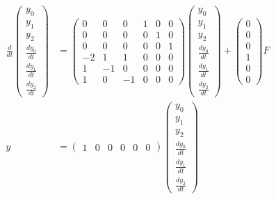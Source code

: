 \documentclass[a4paper,11pt]{jreport}
\begin{document}
\begin{align}
 \frac{d}{dt} \left(\begin{array}{c}
	         y_0 \\
		     y_1 \\
		     y_2 \\
		     \frac{dy_0}{dt} \\
		     \frac{dy_1}{dt} \\
		     \frac{dy_2}{dt}
		    \end{array}\right)
 &=
 \left(\begin{array}{rrrrrr}
        0 & 0 & 0 & 1 & 0 & 0      \\
        0 & 0 & 0 & 0 & 1 & 0      \\
        0 & 0 & 0 & 0 & 0 & 1      \\
	-2& 1 & 1 & 0 & 0 & 0 \\
	1 & -1& 0 & 0 & 0 & 0 \\
	1 & 0 & -1& 0 & 0 & 0 
       \end{array}\right)
 \left(\begin{array}{c}
	         y_0 \\
		     y_1 \\
		     y_2 \\
		     \frac{dy_0}{dt} \\
		     \frac{dy_1}{dt} \\
		     \frac{dy_2}{dt}
       \end{array}\right)
 +
 \left(\begin{array}{c}
        0 \\
        0 \\
        0 \\
	    1 \\
	    0 \\
	    0 
       \end{array}\right)
        F
\nonumber
\\
y &=
 \left(\begin{array}{cccccc}
         1 & 0 & 0 & 0 & 0 & 0
       \end{array}\right)
 \left(\begin{array}{c}
	         y_0 \\
		     y_1 \\
		     y_2 \\
		     \frac{dy_0}{dt} \\
		     \frac{dy_1}{dt} \\
		     \frac{dy_2}{dt}
       \end{array}\right)
\nonumber
\end{align}
\end{document}
